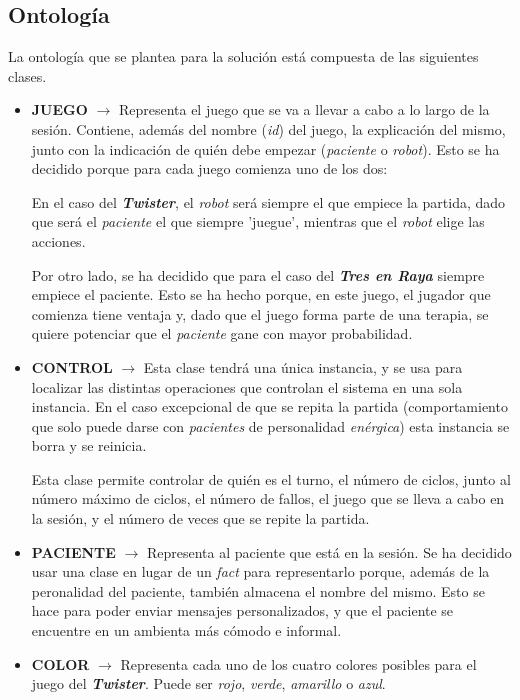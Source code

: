 \documentclass{uc3mpracticas}
\begin{document}
  \newpage

  \subsection{Ontología}

  La ontología que se plantea para la solución está compuesta de las siguientes clases.

  \begin{itemize}
    \item \textbf{JUEGO} $\rightarrow$ Representa el juego que se va a llevar a cabo a lo largo de la sesión. Contiene, además del nombre (\textit{id}) del juego, la explicación del mismo, junto con la indicación de quién debe empezar (\textit{paciente} o \textit{robot}). Esto se ha decidido porque para cada juego comienza uno de los dos:

    \vspace{1mm}

    En el caso del \textbf{\textit{Twister}}, el \textit{robot} será siempre el que empiece la partida, dado que será el \textit{paciente} el que siempre 'juegue', mientras que el \textit{robot} elige las acciones.

    \vspace{2mm}

    Por otro lado, se ha decidido que para el caso del \textit{\textbf{Tres en Raya}} siempre empiece el paciente. Esto se ha hecho porque, en este juego, el jugador que comienza tiene ventaja y, dado que el juego forma parte de una terapia, se quiere potenciar que el \textit{paciente} gane con mayor probabilidad.

    \item \textbf{CONTROL} $\rightarrow$ Esta clase tendrá una única instancia, y se usa para localizar las distintas operaciones que controlan el sistema en una sola instancia. En el caso excepcional de que se repita la partida (comportamiento que solo puede darse con \textit{pacientes} de personalidad \textit{enérgica}) esta instancia se borra y se reinicia.

    \vspace{2mm}

    Esta clase permite controlar de quién es el turno, el número de ciclos, junto al número máximo de ciclos, el número de fallos, el juego que se lleva a cabo en la sesión, y el número de veces que se repite la partida.

    \item \textbf{PACIENTE} $\rightarrow$ Representa al paciente que está en la sesión. Se ha decidido usar una clase en lugar de un \textit{fact} para representarlo porque, además de la peronalidad del paciente, también almacena el nombre del mismo. Esto se hace para poder enviar mensajes personalizados, y que el paciente se encuentre en un ambienta más cómodo e informal.
    \item \textbf{COLOR} $\rightarrow$ Representa cada uno de los cuatro colores posibles para el juego del \textbf{\textit{Twister}}. Puede ser \textit{rojo}, \textit{verde}, \textit{amarillo} o \textit{azul}.


\end{itemize}
\end{document}
